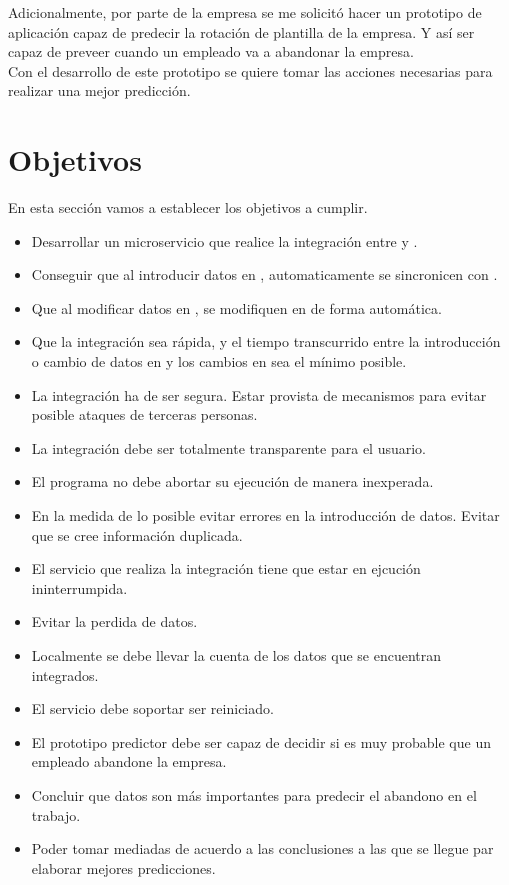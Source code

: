 Adicionalmente, por parte de la empresa se me solicitó hacer un prototipo de aplicación capaz de predecir la rotación de plantilla de la empresa.
Y así ser capaz de preveer cuando un empleado va a abandonar la empresa. \\

Con el desarrollo de este prototipo se quiere tomar las acciones necesarias para realizar una mejor predicción.



\section{Objetivos}

En esta sección vamos a establecer los objetivos a cumplir.

\begin{itemize}
	\item Desarrollar un microservicio que realice la integración entre \hs{} y \wday{}.
	\item Conseguir que al introducir datos en \hs{}, automaticamente se sincronicen con \wday{}.
	\item Que al modificar datos en \hs{}, se modifiquen en \wday{} de forma automática.
	\item Que la integración sea rápida, y el tiempo transcurrido entre la introducción o cambio de datos en \hs{} y los cambios en \wday{} sea el mínimo posible.
	\item La integración ha de ser segura. Estar provista de mecanismos para evitar posible ataques de terceras personas.
	\item La integración debe ser totalmente transparente para el usuario. 
	\item El programa no debe abortar su ejecución de manera inexperada.
	\item En la medida de lo posible evitar errores en la introducción de datos. Evitar que se cree información duplicada.
	\item El servicio que realiza la integración tiene que estar en ejcución ininterrumpida.
	\item Evitar la perdida de datos.
	\item Localmente se debe llevar la cuenta de los datos que se encuentran integrados.
	\item El servicio debe soportar ser reiniciado.
	\item El prototipo predictor debe ser capaz de decidir si es muy probable que un empleado abandone la empresa.
	\item Concluir que datos son más importantes para predecir el abandono en el trabajo.
	\item Poder tomar mediadas de acuerdo a las conclusiones a las que se llegue par elaborar mejores predicciones.
\end{itemize}


